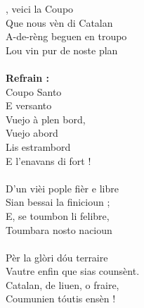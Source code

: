  , veici la Coupo
\\Que nous vèn di Catalan
\\A-de-rèng beguen en troupo
\\Lou vin pur de noste plan
\\\\\textbf{Refrain :}
\\Coupo Santo
\\E versanto
\\Vuejo à plen bord,
\\Vuejo abord
\\Lis estrambord
\\E l'enavans di fort !
\\\\D'un vièi pople fièr e libre
\\Sian bessai la finicioun ;
\\E, se toumbon li felibre,
\\Toumbara nosto nacioun
\\\\Pèr la glòri dóu terraire
\\Vautre enfin que sias counsènt.
\\Catalan, de liuen, o fraire,
\\Coumunien tóutis ensèn !
\\
\breakpage